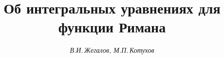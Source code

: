 









\newcommand{\tts}[1]{}










\setcounter{page}{26}












\author{\it В.И.\,Жегалов, М.П.\,Котухов}




\title{Об интегральных уравнениях для функции Римана}





\date{}







\pagestyle{plain} %













\maketitle








